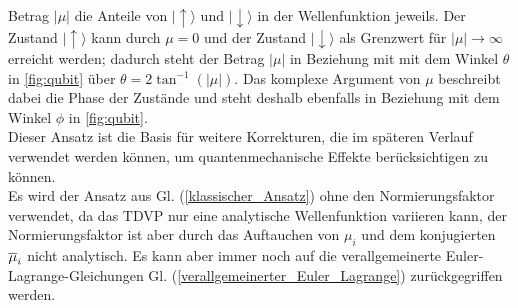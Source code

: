 Betrag $|\mu|$ die Anteile von $|\uparrow\rangle$ und $|\downarrow\rangle$ in der Wellenfunktion jeweils. Der Zustand $|\uparrow\rangle$ kann durch $\mu=0$ 
und der Zustand $|\downarrow\rangle$ als Grenzwert für $|\mu|\rightarrow \infty$ erreicht werden; dadurch steht der Betrag $|\mu|$ in Beziehung mit
mit dem Winkel $\theta$ in \autoref{fig:qubit} über $\theta = 2\tan^{-1}(|\mu|)$. Das komplexe Argument von $\mu$ beschreibt dabei die Phase der 
Zustände und steht deshalb ebenfalls in Beziehung mit dem Winkel $\phi$ in \autoref{fig:qubit}.\\
Dieser Ansatz ist die Basis für weitere Korrekturen, die im späteren Verlauf verwendet werden können, um quantenmechanische Effekte berücksichtigen zu 
können.\\
Es wird der Ansatz aus Gl. (\ref{klassischer_Ansatz}) ohne den Normierungsfaktor verwendet, da das TDVP nur eine analytische Wellenfunktion variieren kann,
der Normierungsfaktor ist aber durch das Auftauchen von $\mu_i$ und dem konjugierten $\overline{\mu}_i$ nicht analytisch. Es kann aber immer noch auf die 
verallgemeinerte Euler-Lagrange-Gleichungen Gl. (\ref{verallgemeinerter_Euler_Lagrange}) zurückgegriffen werden.\\
